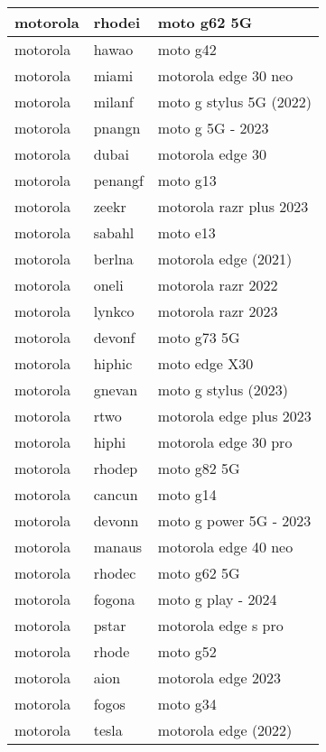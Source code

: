 \begin{tabularx}{\linewidth}{|l|X|X|}
        motorola & rhodei & moto g62 5G \\ \hline
        motorola & hawao & moto g42 \\ \hline
        motorola & miami & motorola edge 30 neo \\ \hline
        motorola & milanf & moto g stylus 5G (2022) \\ \hline
        motorola & pnangn & moto g 5G - 2023 \\ \hline
        motorola & dubai & motorola edge 30 \\ \hline
        motorola & penangf & moto g13 \\ \hline
        motorola & zeekr & motorola razr plus 2023 \\ \hline
        motorola & sabahl & moto e13 \\ \hline
        motorola & berlna & motorola edge (2021) \\ \hline
        motorola & oneli & motorola razr 2022 \\ \hline
        motorola & lynkco & motorola razr 2023 \\ \hline
        motorola & devonf & moto g73 5G \\ \hline
        motorola & hiphic & moto edge X30 \\ \hline
        motorola & gnevan & moto g stylus (2023) \\ \hline
        motorola & rtwo & motorola edge plus 2023 \\ \hline
        motorola & hiphi & motorola edge 30 pro \\ \hline
        motorola & rhodep & moto g82 5G \\ \hline
        motorola & cancun & moto g14 \\ \hline
        motorola & devonn & moto g power 5G - 2023 \\ \hline
        motorola & manaus & motorola edge 40 neo \\ \hline
        motorola & rhodec & moto g62 5G \\ \hline
        motorola & fogona & moto g play - 2024 \\ \hline
        motorola & pstar & motorola edge s pro \\ \hline
        motorola & rhode & moto g52 \\ \hline
        motorola & aion & motorola edge 2023 \\ \hline
        motorola & fogos & moto g34 \\ \hline
        motorola & tesla & motorola edge (2022) \\ \hline

\end{tabularx}
